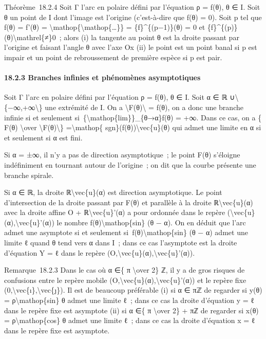 \documentclass[]{article}
\begin{document}
Théorème~18.2.4 Soit Γ l'arc en polaire défini par l'équation ρ = f(θ),
θ ∈ I. Soit θ un point de I dont l'image est l'origine (c'est-à-dire que
f(θ) = 0). Soit p tel que f(θ) = f'(θ) =
\textbackslash{}mathop\{\textbackslash{}mathop\{\ldots{}\}\} =
\{f\}\^{}\{(p−1)\}(θ) = 0 et
\{f\}\^{}\{(p)\}(θ)\textbackslash{}mathrel\{≠\}0~; alors (i) la tangente
au point θ est la droite passant par l'origine et faisant l'angle θ avec
l'axe Ox (ii) le point est un point banal si p est impair et un point de
rebroussement de première espèce si p est pair.

\paragraph{18.2.3 Branches infinies et phénomènes asymptotiques}

Soit Γ l'arc en polaire défini par l'équation ρ = f(θ), θ ∈ I. Soit α ∈
ℝ ∪\textbackslash{}\{−∞,+∞\textbackslash{}\} une extrémité de I. On a
\textbackslash{}\textbar{}F(θ)\textbackslash{}\textbar{} =
\textbar{}f(θ)\textbar{}, on a donc une branche infinie si et seulement
si~\{\textbackslash{}mathop\{lim\}\}\_\{θ→α\}\textbar{}f(θ)\textbar{} =
+∞. Dans ce cas, on a \{ F(θ) \textbackslash{}over
\textbackslash{}\textbar{}F(θ)\textbackslash{}\textbar{}\}
=\textbackslash{}mathop\{ sgn\}(f(θ))\textbackslash{}vec\{u\}(θ) qui
admet une limite en α si et seulement si α est fini.

Si α = ±∞, il n'y a pas de direction asymptotique~; le point F(θ)
s'éloigne indéfiniment en tournant autour de l'origine~; on dit que la
courbe présente une branche spirale.

Si α ∈ ℝ, la droite ℝ\textbackslash{}vec\{u\}(α) est direction
asymptotique. Le point d'intersection de la droite passant par F(θ) et
parallèle à la droite ℝ\textbackslash{}vec\{u\}(α) avec la droite affine
O + ℝ\textbackslash{}vec\{u\}'(α) a pour ordonnée dans le repère
(\textbackslash{}vec\{u\}(α),\textbackslash{}vec\{u\}'(α)) le nombre
f(θ)\textbackslash{}mathop\{sin\} (θ − α). On en déduit que l'arc admet
une asymptote si et seulement si~f(θ)\textbackslash{}mathop\{sin\} (θ −
α) admet une limite ℓ quand θ tend vers α dans I~; dans ce cas
l'asymptote est la droite d'équation Y = ℓ dans le repère
(O,\textbackslash{}vec\{u\}(α),\textbackslash{}vec\{u\}'(α)).

Remarque~18.2.3 Dans le cas où α ∈\{ π \textbackslash{}over 2\} ℤ, il y
a de gros risques de confusions entre le repère mobile
(O,\textbackslash{}vec\{u\}(α),\textbackslash{}vec\{u\}'(α)) et le
repère fixe (0,\textbackslash{}vec\{ı\},\textbackslash{}vec\{ȷ\}). Il
est de beaucoup préférable (i) si α ∈ πℤ de regarder si y(θ) =
ρ\textbackslash{}mathop\{sin\} θ admet une limite ℓ~; dans ce cas la
droite d'équation y = ℓ dans le repère fixe est asymptote (ii) si α ∈\{
π \textbackslash{}over 2\} + πℤ de regarder si x(θ) =
ρ\textbackslash{}mathop\{cos\} θ admet une limite ℓ~; dans ce cas la
droite d'équation x = ℓ dans le repère fixe est asymptote.
\end{document}
